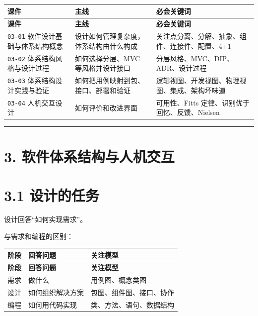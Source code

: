 \documentclass[UTF8,zihao=-4]{ctexart}
\begin{document}
{
\footnotesize
\begin{longtable}{|>{\raggedright\arraybackslash}p{}|>{\raggedright\arraybackslash}p{}|>{\raggedright\arraybackslash}p{}|}
\hline
\textbf{课件} & \textbf{主线} & \textbf{必会关键词} \\
\hline
\endfirsthead
\hline
\textbf{课件} & \textbf{主线} & \textbf{必会关键词} \\
\hline
\endhead
\texttt{03-01} 软件设计基础与体系结构概念 & 设计如何管理复杂度，体系结构由什么构成 & 关注点分离、分解、抽象、组件、连接件、配置、4+1 \\
\hline
\texttt{03-02} 体系结构风格与设计过程 & 如何选择分层、MVC 等风格并设计接口 & 分层风格、MVC、DIP、ADR、设计过程 \\
\hline
\texttt{03-03} 体系结构设计实践与验证 & 如何把用例映射到包、接口、部署和验证 & 逻辑视图、开发视图、物理视图、集成、架构坏味道 \\
\hline
\texttt{03-04} 人机交互设计 & 如何评价和改进界面 & 可用性、Fitts 定律、识别优于回忆、反馈、Nielsen \\
\hline
\end{longtable}
}


\bigskip\hrule\bigskip

\section{3. 软件体系结构与人机交互}

\section{3.1 设计的任务}

设计回答“如何实现需求”。

与需求和编程的区别：

{
\footnotesize
\begin{longtable}{|>{\raggedright\arraybackslash}p{}|>{\raggedright\arraybackslash}p{}|>{\raggedright\arraybackslash}p{}|}
\hline
\textbf{阶段} & \textbf{回答问题} & \textbf{关注模型} \\
\hline
\endfirsthead
\hline
\textbf{阶段} & \textbf{回答问题} & \textbf{关注模型} \\
\hline
\endhead
需求 & 做什么 & 用例图、概念类图 \\
\hline
设计 & 如何组织解决方案 & 包图、组件图、接口、协作 \\
\hline
编程 & 如何用代码实现 & 类、方法、语句、数据结构 \\
\hline
\end{longtable}
}
\end{document}
